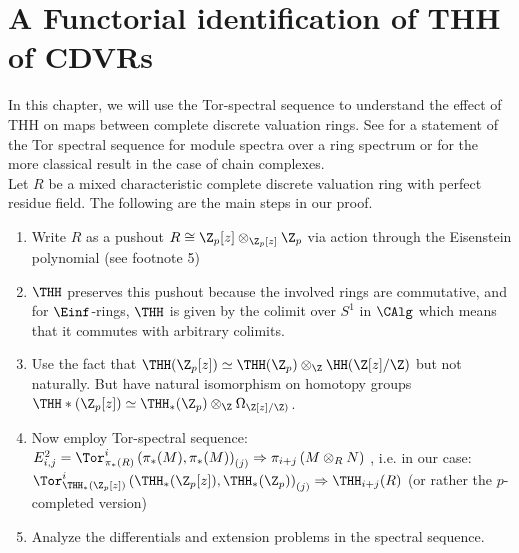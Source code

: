 \chapter{A Functorial identification of THH of CDVRs}
In this chapter, we will use the Tor-spectral sequence to understand the effect of THH on maps between complete discrete valuation rings.
See \cite[~Proposition 7.2.1.19]{lurie2017higher} for a statement of the Tor spectral sequence for module spectra over a ring spectrum 
or \cite[\href{https://stacks.math.columbia.edu/tag/061Y}{Tag 061Y}]{stacks-project} for the more classical result in the case of chain complexes.
\\
Let $R$ be a mixed characteristic complete discrete valuation ring with perfect residue field. The following are the main steps in our proof.
\begin{enumerate}
    \item Write $R$ as a pushout $R\cong\Z_p[z]\otimes_{\Z_p[z]}\Z_p$ via action through the Eisenstein polynomial (see footnote 5)
    \item $\THH$ preserves this pushout because the involved rings are commutative, and for $\Einf$-rings, $\THH$ is given by the colimit over $S^1$ in $\CAlg$ which means that it commutes with arbitrary colimits.
    \item Use the fact that $\THH(\Z_p[z])\simeq \THH(\Z_p)\otimes_\Z \HH(\Z[z]/\Z)$ but not naturally. But have natural isomorphism on homotopy groups
    $\THH*(\Z_p[z])\simeq \THH_*(\Z_p)\otimes_\Z \Omega_{\Z[z]/\Z)}$.
    \item Now employ Tor-spectral sequence:\\
     $E^2_{i,j}=\Tor_{\pi_*(R)}^i\left( \pi_*(M), \pi_*(M)\right)_{(j)}\Rightarrow \pi_{i+j}\left( M\otimes_R N \right)$
    , i.e. in our case: 
    \\
    $\Tor_{\THH_*(\Z_p[z])}^i\left( \THH_*(\Z_p[z]),\THH_*(\Z_p)\right)_{(j)}\Rightarrow \THH_{i+j}(R)$ (or rather the $p$-completed version)
    \item Analyze the differentials and extension problems in the spectral sequence.
\end{enumerate}
